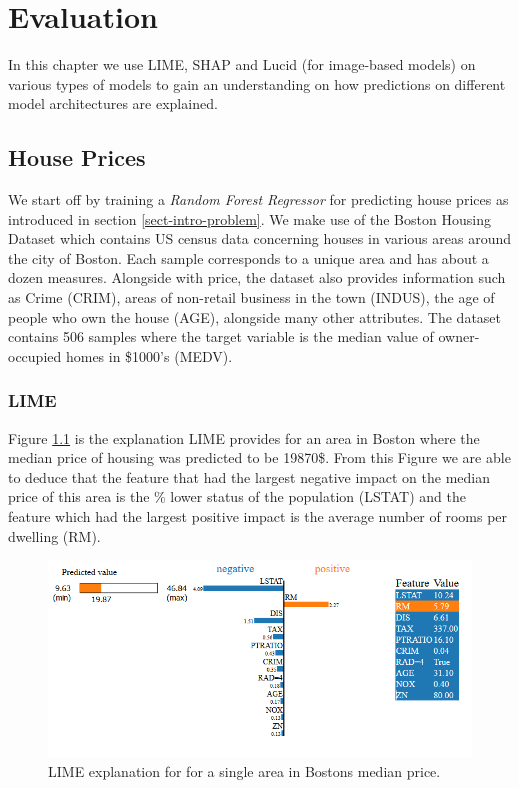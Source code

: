 

\chapter{Evaluation} \label{sect-evaluation}
In this chapter we use LIME, SHAP and Lucid (for image-based models) on various types of models to gain an understanding on how predictions on different model architectures are explained.

\section{House Prices}
We start off by training a \emph{Random Forest Regressor} for predicting house prices as introduced in section \ref{sect-intro-problem}. We make use of the  Boston Housing Dataset which contains US census data concerning houses in various areas around the city of Boston. Each sample corresponds to a unique area and has about a dozen measures. Alongside with price, the dataset also provides information such as Crime (CRIM), areas of non-retail business in the town (INDUS), the age of people who own the house (AGE), alongside many other attributes.  The dataset contains 506 samples where the target variable is the median value of owner-occupied homes in \$1000's (MEDV).

\subsection{LIME}
Figure \ref{fig:lime-house} is the explanation LIME provides for an area in Boston where the median price of housing was predicted to be 19870\$. From this Figure we are able to deduce that the feature that had the largest negative impact on the median price of this area is the \% lower status of the population (LSTAT) and the feature which had the largest positive impact is the average number of rooms per dwelling (RM).
\begin  {figure}[!htpb]
  \includegraphics[width=\linewidth]{Evaluation_Images/House_LIME.png}
  \caption{LIME explanation for for a single area in Bostons median price.}
  \label{fig:lime-house}
\end{figure}
